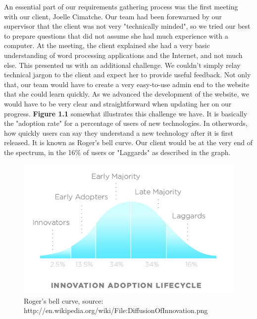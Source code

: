 \documentclass{l3proj}
\begin{document}
An essential part of our requirements gathering process was the first meeting with our client, Joelle Cimatche. Our team had been forewarned by our supervisor that the client was not very "technically minded", so we tried our best to prepare questions that did not assume she had much experience with a computer. At the meeting, the client explained she had a very basic understanding of word processing applications and the Internet, and not much else. This presented us with an additional challenge. We couldn't simply relay technical jargon to the client and expect her to provide useful feedback. Not only that, our team would have to create a very easy-to-use admin end to the website that she could learn quickly. As we advanced the development of the website, we would have to be very clear and straightforward when updating her on our progress. \textbf{Figure 1.1} somewhat illustrates this challenge we have. It is basically the "adoption rate" for a percentage of users of new technologies. In otherwords, how quickly users can say they understand a new technology after it is first released. It is known as Roger's bell curve. Our client would be at the very end of the spectrum, in the 16\% of users or "Laggards" as described in the graph.\\

\begin{figure}
\begin{center}
\includegraphics[scale=0.6]{DiffusionOfInnovation}
\caption{Roger's bell curve, source: http://en.wikipedia.org/wiki/File:DiffusionOfInnovation.png}
\end{center}
\end{figure}
\end{document}

